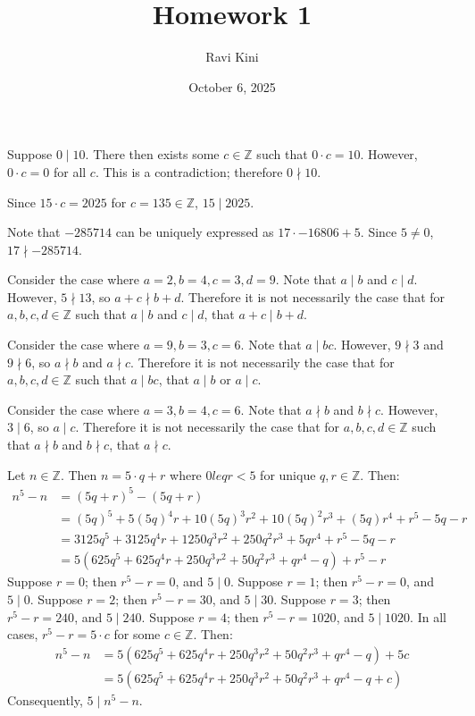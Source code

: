\documentclass{article}
\title{Homework 1}
\author{Ravi Kini}
\date{October 6, 2025}
\begin{document}
\maketitle

\problem{}
Suppose $0 \mid 10$. There then exists some $c \in \mathbb{Z}$ such that $0 \cdot c = 10$. However, $0 \cdot c = 0$ for all $c$. This is a contradiction; therefore $0 \nmid 10$.

Since $15 \cdot c = 2025$ for $c = 135 \in \mathbb{Z}$, $15 \mid 2025$.

Note that $-285714$ can be uniquely expressed as $17 \cdot -16806 + 5$. Since $5 \neq 0$, $17 \nmid -285714$.

\clearpage

\problem{}
Consider the case where $a = 2, b = 4, c = 3, d = 9$. Note that $a \mid b$ and $c \mid d$. However, $5 \nmid 13$, so $a + c \nmid b + d$. Therefore it is not necessarily the case that for $a, b, c, d \in \mathbb{Z}$ such that $a \mid b$ and $c \mid d$, that $a + c \mid b + d$.

Consider the case where $a = 9, b = 3, c = 6$. Note that $a \mid bc$. However, $9 \nmid 3$ and $9 \nmid 6$, so $a \nmid b$ and $a \nmid c$. Therefore it is not necessarily the case that for $a, b, c, d \in \mathbb{Z}$ such that $a \mid bc$, that $a \mid b$ or $a \mid c$.

Consider the case where $a = 3, b = 4, c = 6$. Note that $a \nmid b$ and $b \nmid c$. However, $3 \mid 6$, so $a \mid c$. Therefore it is not necessarily the case that for $a, b, c, d \in \mathbb{Z}$ such that $a \nmid b$ and $b \nmid c$, that $a \nmid c$.


\clearpage

\problem{}
Let $n \in \mathbb{Z}$. Then $n = 5 \cdot q + r$ where $0 leq r < 5$ for unique $q, r \in \mathbb{Z}$. Then:
\begin{align*}
    n^5 - n & = {(5q + r)}^5 - (5q + r) \\
    & = {(5q)}^5 + 5{(5q)}^4r + 10{(5q)}^3r^2 + 10{(5q)}^2r^3 + (5q)r^4 + r^5 - 5q - r \\
    & = 3125q^5 + 3125q^4r + 1250q^3r^2 + 250q^2r^3 + 5qr^4 + r^5 - 5q - r \\
    & = 5(625q^5 + 625q^4r + 250q^3r^2 + 50q^2r^3 + qr^4 - q) + r^5 - r
\end{align*}
Suppose $r = 0$; then $r^5 - r = 0$, and $5 \mid 0$. 
Suppose $r = 1$; then $r^5 - r = 0$, and $5 \mid 0$.
Suppose $r = 2$; then $r^5 - r = 30$, and $5 \mid 30$.
Suppose $r = 3$; then $r^5 - r = 240$, and $5 \mid 240$.
Suppose $r = 4$; then $r^5 - r = 1020$, and $5 \mid 1020$. In all cases, $r^5 - r = 5 \cdot c$ for some $c \in \mathbb{Z}$. Then:
\begin{align*}
    n^5 - n & = 5(625q^5 + 625q^4r + 250q^3r^2 + 50q^2r^3 + qr^4 - q) + 5c \\
    & = 5(625q^5 + 625q^4r + 250q^3r^2 + 50q^2r^3 + qr^4 - q + c)
\end{align*}
Consequently, $5 \mid n^5 - n$.
\end{document}
